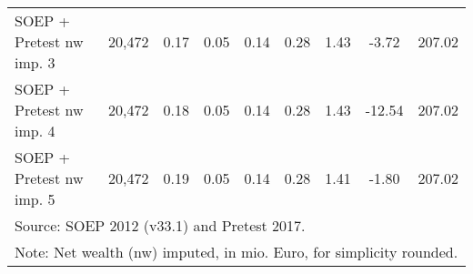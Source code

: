 \begin{table}[htbp]
\begin{tabular}{l*{1}{cccccccc}}
SOEP + Pretest nw imp. 3                    &      20,472&        0.17&        0.05&        0.14&        0.28&        1.43&       -3.72&      207.02\\
SOEP + Pretest nw imp. 4                    &      20,472&        0.18&        0.05&        0.14&        0.28&        1.43&      -12.54&      207.02\\
SOEP + Pretest nw imp. 5                    &      20,472&        0.19&        0.05&        0.14&        0.28&        1.41&       -1.80&      207.02\\
\hline\hline
\multicolumn{9}{l}{\footnotesize Source: SOEP 2012 (v33.1) and Pretest 2017.}\\
\multicolumn{9}{l}{\footnotesize Note: Net wealth (nw) imputed, in mio. Euro, for simplicity rounded.}\\
\end{tabular}
\end{table}
